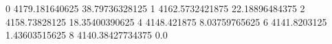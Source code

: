 0 4179.181640625 38.79736328125
1 4162.5732421875 22.18896484375
2 4158.73828125 18.35400390625
4 4148.421875 8.03759765625
6 4141.8203125 1.43603515625
8 4140.38427734375 0.0
